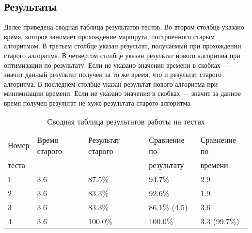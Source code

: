 \FloatBarrier

\subsection{Результаты}
Далее приведена сводная таблица результатов тестов. Во втором столбце указано время,
которое занимает прохождение маршрута, построенного старым алгоритмом. В третьем столбце указан
результат, получаемый при прохождении старого алгоритма. В четвертом столбце указан
результат нового алгоритма при оптимизации по результату. Если не указано значения времени
в скобках --- значит данный результат получен за то же время, что и результат старого алгоритма.
В последнем столбце указан результат нового алгоритма при минимизации времени. Если не указано
значения в скобках --- значит за данное время получен результат не хуже результата старого
алгоритма.

\begin{table}[ht]
  \centering
  \begin{tabular}{|l|l|l|l|l|}
\hline
    Номер & Время старого & Результат старого & Сравнение по & Сравнение по \\
    теста     & & & результату & времени \\
\hline
    1 & 3.6 & 87.5\% & 94.7\% & 2.9 \\ 
    2 & 3.6 & 83.3\% & 92.6\% & 1.9 \\
    3 & 3.6 & 83.3\% & 86.1\% (4.5) & 3.6 \\
    4 & 3.6 & 100.0\%& 100.0\%& 3.3 (99.7\%) \\
\hline

  \end{tabular}
  \captionsetup{justification=centering}
  \caption{Сводная таблица результатов работы на тестах}
  \label{results}
\end{table}

\FloatBarrier
